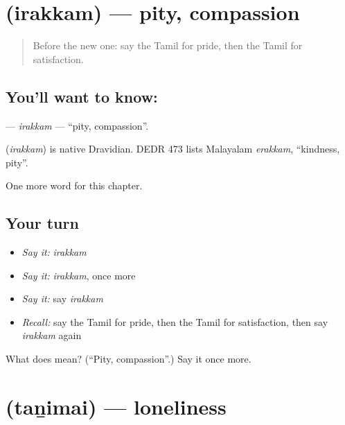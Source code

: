 \section[\texorpdfstring{\ta{இரக்கம்} (irakkam)}{இரக்கம் (irakkam)}]{ (irakkam) — pity, compassion}

\label{lesson:TA-C239-irakkam}



\begin{quote}
Before the new one: say the Tamil for pride, then the Tamil for satisfaction.
\end{quote}

\subsection*{You'll want to know: }
\textbf{} — \emph{irakkam} — \textquotedblleft{}pity, compassion\textquotedblright{}.

\begin{cousinweb}
\textbf{} (\emph{irakkam}) is native Dravidian. DEDR 473 lists Malayalam \emph{erakkam}, \textquotedblleft{}kindness, pity\textquotedblright{}.
\end{cousinweb}

\begin{grammarlens}[title={What you've built}]
One more word for this chapter.
\end{grammarlens}

\subsection*{Your turn}
\begin{itemize}
\raggedright
  \item \emph{Say it:} \emph{irakkam}
  \item \emph{Say it:} \emph{irakkam}, once more
  \item \emph{Say it:} say \emph{irakkam}
  \item \emph{Recall:} say the Tamil for pride, then the Tamil for satisfaction, then say \emph{irakkam} again
\end{itemize}

\begin{tcolorbox}[breakable,colback=teal!4,colframe=teal!35!black,title={Before you move on}]
What does  mean? (\textquotedblleft{}Pity, compassion\textquotedblright{}.) Say it once more.
\end{tcolorbox}
\section[\texorpdfstring{\ta{தனிமை} (taṉimai)}{தனிமை (taṉimai)}]{ (taṉimai) — loneliness}

